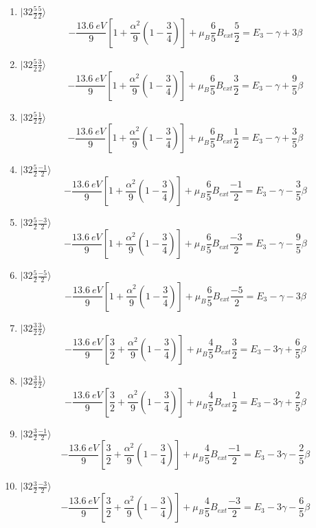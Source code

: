 \begin{enumerate}
$$    \left(
    3-\frac{3}4{}
    \right)
    \right] + \mu_B \frac{2}{3}B_{ext}\frac{-1}{2}
    =E_3 - 9\gamma - \frac{1}{3}\beta
    $$
    \item 
    $|32\frac{5}{2}\frac{5}{2}\rangle$
    $$
    -\frac{\qty{13.6}{eV}}{9}
    \left[
    1 + \frac{\alpha^2}{9}
    \left(
    1-\frac{3}4{}
    \right)
    \right] + \mu_B \frac{6}{5}B_{ext}\frac{5}{2}
    =E_3 - \gamma + 3\beta
    $$
    \item 
    $|32\frac{5}{2}\frac{3}{2}\rangle$
    $$
    -\frac{\qty{13.6}{eV}}{9}
    \left[
    1 + \frac{\alpha^2}{9}
    \left(
    1-\frac{3}4{}
    \right)
    \right] + \mu_B \frac{6}{5}B_{ext}\frac{3}{2}
    =E_3 - \gamma + \frac{9}{5}\beta
    $$
    \item 
    $|32\frac{5}{2}\frac{1}{2}\rangle$
    $$
    -\frac{\qty{13.6}{eV}}{9}
    \left[
    1 + \frac{\alpha^2}{9}
    \left(
    1-\frac{3}4{}
    \right)
    \right] + \mu_B \frac{6}{5}B_{ext}\frac{1}{2}
    =E_3 -\gamma + \frac{3}{5}\beta
    $$
    \item 
    $|32\frac{5}{2}\frac{-1}{2}\rangle$
    $$
    -\frac{\qty{13.6}{eV}}{9}
    \left[
    1 + \frac{\alpha^2}{9}
    \left(
    1-\frac{3}4{}
    \right)
    \right] + \mu_B \frac{6}{5}B_{ext}\frac{-1}{2}
    =E_3 - \gamma - \frac{3}{5}\beta
    $$
    \item 
    $|32\frac{5}{2}\frac{-3}{2}\rangle$
    $$
    -\frac{\qty{13.6}{eV}}{9}
    \left[
    1 + \frac{\alpha^2}{9}
    \left(
    1-\frac{3}4{}
    \right)
    \right] + \mu_B \frac{6}{5}B_{ext}\frac{-3}{2}
    =E_3 -\gamma - \frac{9}{5}\beta
    $$
    \item 
    $|32\frac{5}{2}\frac{-5}{2}\rangle$
    $$
    -\frac{\qty{13.6}{eV}}{9}
    \left[
    1 + \frac{\alpha^2}{9}
    \left(
    1-\frac{3}4{}
    \right)
    \right] + \mu_B \frac{6}{5}B_{ext}\frac{-5}{2}
    =E_3 - \gamma - 3\beta
    $$
    \item 
    $|32\frac{3}{2}\frac{3}{2}\rangle$
    $$
    -\frac{\qty{13.6}{eV}}{9}
    \left[
    \frac{3}{2} + \frac{\alpha^2}{9}
    \left(
    1-\frac{3}4{}
    \right)
    \right] + \mu_B \frac{4}{5}B_{ext}\frac{3}{2}
    =E_3 - 3\gamma + \frac{6}{5}\beta
    $$
    \item 
    $|32\frac{3}{2}\frac{1}{2}\rangle$
    $$
    -\frac{\qty{13.6}{eV}}{9}
    \left[
    \frac{3}{2} + \frac{\alpha^2}{9}
    \left(
    1-\frac{3}4{}
    \right)
    \right] + \mu_B \frac{4}{5}B_{ext}\frac{1}{2}
    =E_3 - 3\gamma + \frac{2}{5}\beta
    $$
    \item 
    $|32\frac{3}{2}\frac{-1}{2}\rangle$
    $$
    -\frac{\qty{13.6}{eV}}{9}
    \left[
    \frac{3}{2} + \frac{\alpha^2}{9}
    \left(
    1-\frac{3}4{}
    \right)
    \right] + \mu_B \frac{4}{5}B_{ext}\frac{-1}{2}
    =E_3 - 3\gamma - \frac{2}{5}\beta
    $$
    \item 
    $|32\frac{3}{2}\frac{-3}{2}\rangle$
    $$
    -\frac{\qty{13.6}{eV}}{9}
    \left[
    \frac{3}{2} + \frac{\alpha^2}{9}
    \left(
    1-\frac{3}4{}
    \right)
    \right] + \mu_B \frac{4}{5}B_{ext}\frac{-3}{2}
    =E_3 - 3\gamma - \frac{6}{5}\beta
    $$
\end{enumerate}

